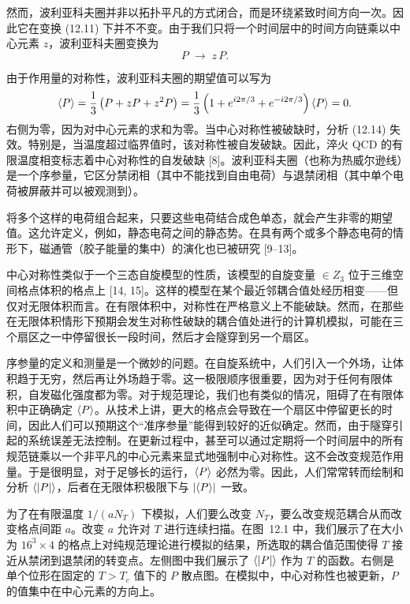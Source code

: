 然而，波利亚科夫圈并非以拓扑平凡的方式闭合，而是环绕紧致时间方向一次。因此它在变换 (12.11) 下并不不变。由于我们只将一个时间层中的时间方向链乘以中心元素 $z$，波利亚科夫圈变换为
\begin{equation}
  P \;\to\; z\,P.
\end{equation}

由于作用量的对称性，波利亚科夫圈的期望值可以写为
\begin{equation}
  \left\langle P \right\rangle = \frac{1}{3}\left(P + zP + z^2P\right)
    = \frac{1}{3}\left(1 + e^{i2\pi/3} + e^{-i2\pi/3}\right)\left\langle P \right\rangle = 0 .
\end{equation}
右侧为零，因为对中心元素的求和为零。当中心对称性被破缺时，分析 (12.14) 失效。特别是，当温度超过临界值时，该对称性被自发破缺。因此，淬火 QCD 的有限温度相变标志着中心对称性的自发破缺 [8]。波利亚科夫圈（也称为热威尔逊线）是一个序参量，它区分禁闭相（其中不能找到自由电荷）与退禁闭相（其中单个电荷被屏蔽并可以被观测到）。

将多个这样的电荷组合起来，只要这些电荷结合成色单态，就会产生非零的期望值。这允许定义，例如，静态电荷之间的静态势。在具有两个或多个静态电荷的情形下，磁通管（胶子能量的集中）的演化也已被研究 [9--13]。

中心对称性类似于一个三态自旋模型的性质，该模型的自旋变量 $\in Z_3$ 位于三维空间格点体积的格点上 [14, 15]。这样的模型在某个最近邻耦合值处经历相变——但仅对无限体积而言。在有限体积中，对称性在严格意义上不能破缺。然而，在那些在无限体积情形下预期会发生对称性破缺的耦合值处进行的计算机模拟，可能在三个扇区之一中停留很长一段时间，然后才会隧穿到另一个扇区。

序参量的定义和测量是一个微妙的问题。在自旋系统中，人们引入一个外场，让体积趋于无穷，然后再让外场趋于零。这一极限顺序很重要，因为对于任何有限体积，自发磁化强度都为零。对于规范理论，我们也有类似的情况，阻碍了在有限体积中正确确定 $\left\langle P \right\rangle$。从技术上讲，更大的格点会导致在一个扇区中停留更长的时间，因此人们可以预期这个“准序参量”能得到较好的近似确定。然而，由于隧穿引起的系统误差无法控制。在更新过程中，甚至可以通过定期将一个时间层中的所有规范链乘以一个非平凡的中心元素来显式地强制中心对称性。这不会改变规范作用量。于是很明显，对于足够长的运行，$\left\langle P \right\rangle$ 必然为零。因此，人们常常转而绘制和分析 $\left\langle |P| \right\rangle$，后者在无限体积极限下与 $\left|\left\langle P \right\rangle\right|$ 一致。

为了在有限温度 $1/(aN_T)$ 下模拟，人们要么改变 $N_T$，要么改变规范耦合从而改变格点间距 $a$。改变 $a$ 允许对 $T$ 进行连续扫描。在图~12.1 中，我们展示了在大小为 $16^3\times 4$ 的格点上对纯规范理论进行模拟的结果，所选取的耦合值范围使得 $T$ 接近从禁闭到退禁闭的转变点。左侧图中我们展示了 $\left\langle |P| \right\rangle$ 作为 $T$ 的函数。右侧是单个位形在固定的 $T > T_c$ 值下的 $P$ 散点图。在模拟中，中心对称性也被更新，$P$ 的值集中在中心元素的方向上。

